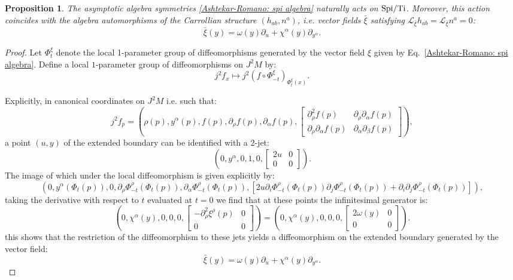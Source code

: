 \documentclass[a4paper, 10pt]{article}
\newtheorem{proposition}{Proposition}[section]
\theoremstyle{remark}
\newcommand{\Ti}{\textnormal{Ti}}
\newcommand{\Spi}{\textnormal{Spi}}
\begin{document}
\begin{proposition}\label{Proposition: Spi group as automorphism}
    The asymptotic algebra symmetries \eqref{Ashtekar-Romano: spi algebra} naturally acts on $\Spi/\Ti$. Moreover, this action coincides with the algebra automorphisms of the Carrollian structure $(h_{ab}, n^{a})$, i.e. vector fields $\bar\xi$ satisfying $\mathcal{L}_{\bar\xi} h_{ab} = \mathcal{L}_{\bar\xi} n^a = 0$:
     \begin{equation}\label{Ti: spi algebra}
         \bar\xi(y) = \omega(y)\partial_u + \chi^\alpha(y) \partial_{y^\alpha}.
     \end{equation}

\end{proposition}
\begin{proof}\mbox{}
Let $\Phi_t^\xi$ denote the local 1-parameter group of diffeomorphisms generated by the vector field $\xi$ given by Eq.~\eqref{Ashtekar-Romano: spi algebra}. Define a local $1$-parameter group of diffeomorphisms on $J^2M$ by:
\[ j^2f_x \mapsto j^2(f\circ\Phi_{-t}^\xi)_{\Phi_t^\xi(x)}. \] 

Explicitly, in canonical coordinates on $J^2M$ i.e. such that:
\[ j^2f_p = (\rho(p), y^\alpha(p), f(p), \partial_\rho f(p), \partial_\alpha f(p),\begin{bmatrix} \partial^2_\rho f(p) & \partial_\rho\partial_\alpha f(p) \\  \partial_\rho\partial_\alpha f(p) & \partial_\alpha\partial_\beta f(p)\end{bmatrix}),\]
a point $(u,y)$ of the extended boundary can be identified with a $2$-jet:
\[ (0,y^\alpha, 0,1,0,\begin{bmatrix}2u&0\\0&0\end{bmatrix}).\]
The image of which under the local diffeomorphism is given explicitly by:
\begin{equation}\label{eq:InducedSymmetry} (0, y^\alpha(\Phi_{t}(p)), 0, \partial_\rho\Phi^\rho_{-t}(\Phi_t(p)), \partial_\alpha \Phi^\rho_{-t}(\Phi_t(p)),[2u\partial_i\Phi^\rho_{-t}(\Phi_{t}(p))\partial_j\Phi^\rho_{-t}(\Phi_{t}(p)) + \partial_i\partial_j \Phi^\rho_{-t}(\Phi_t(p))]),\end{equation}
taking the derivative with respect to $t$ evaluated at $t=0$ we find that at these points the infinitesimal generator is:
\[(0, \chi^\alpha(y), 0, 0, 0, \begin{bmatrix}-\partial^2_\rho \xi^\rho (p) & 0 \\ 0 & 0 \end{bmatrix})=(0,\chi^\alpha(y),0,0,0,\begin{bmatrix}2\omega(y) & 0 \\ 0 & 0\end{bmatrix}).\]
this shows that the restriction of the diffeomorphism to these jets yields a diffeomorphism on the extended boundary generated by the vector field: 
\[ \bar\xi(y) = \omega(y)\partial_u + \chi^\alpha(y) \partial_{y^\alpha}. \]
\end{proof}
\end{document}
